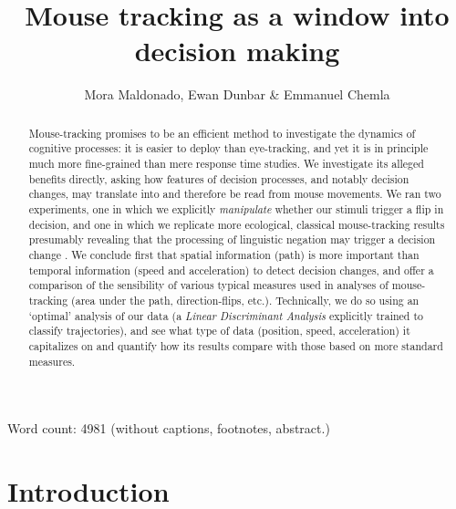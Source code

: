 \documentclass[draft]{article}
\title{Mouse tracking as a window into decision making}
\author{Mora Maldonado, Ewan Dunbar \& Emmanuel Chemla}
\begin{document}
\maketitle

\begin{abstract}
Mouse-tracking promises to be an efficient method to investigate the dynamics of cognitive processes: it is easier to deploy than eye-tracking, and yet it is in principle much more fine-grained than mere response time studies. We investigate its alleged benefits directly, asking how features of decision processes, and notably decision changes, may translate into and therefore be read from mouse movements.
We ran two experiments, one in which we explicitly \emph{manipulate} whether our stimuli trigger a flip in decision, and one in which we replicate more ecological, classical mouse-tracking results presumably revealing that the processing of linguistic negation may trigger a decision change \citep{Dale2011}. We conclude first that spatial information (path) is more important than temporal information (speed and acceleration) to detect decision changes, and offer a comparison of the sensibility of various typical measures used in analyses of mouse-tracking (area under the path, direction-flips, etc.). 
Technically, we do so using an `optimal' analysis of our data (a \emph{Linear Discriminant Analysis} explicitly trained to classify trajectories), and see what type of data (position, speed, acceleration) it capitalizes on and quantify how its results compare with those based on more standard measures.

\end{abstract}


Word count: 4981 (without captions, footnotes, abstract.)

\section{Introduction}
\end{document}
